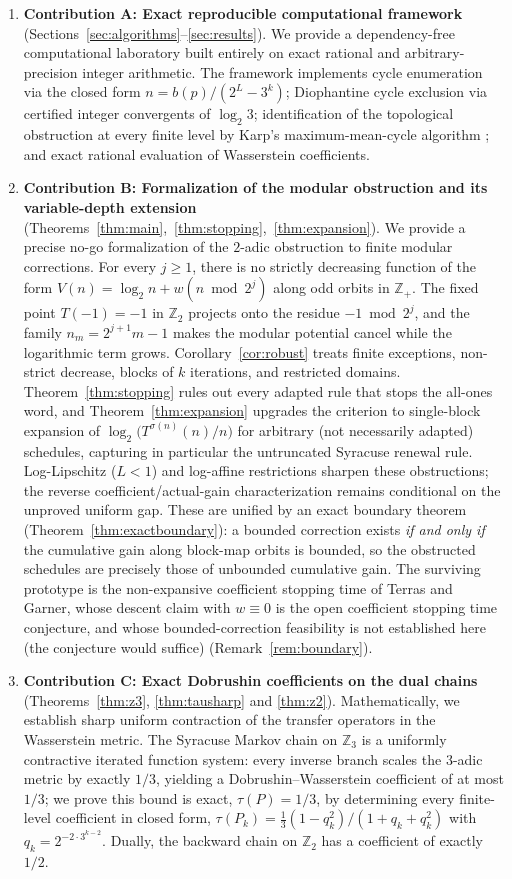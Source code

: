 \documentclass[11pt]{amsart}
\theoremstyle{definition}
\theoremstyle{remark}
\newcommand{\Z}{\mathbb{Z}}
\newcommand{\Ztwo}{\Z_2}
\newcommand{\Zthree}{\Z_3}
\begin{document}
\begin{enumerate}
\item \textbf{Contribution A: Exact reproducible computational framework} (Sections~\ref{sec:algorithms}--\ref{sec:results}). We provide a dependency-free computational laboratory built entirely on exact rational and arbitrary-precision integer arithmetic. The framework implements cycle enumeration via the closed form $n = b(p)/(2^L-3^k)$; Diophantine cycle exclusion via certified integer convergents of $\log_2 3$; identification of the topological obstruction at every finite level by Karp's maximum-mean-cycle algorithm \cite{karp1978}; and exact rational evaluation of Wasserstein coefficients.
\item \textbf{Contribution B: Formalization of the modular obstruction and its variable-depth extension} (Theorems~\ref{thm:main},~\ref{thm:stopping},~\ref{thm:expansion}). We provide a precise no-go formalization of the $2$-adic obstruction to finite modular corrections. For every $j \ge 1$, there is no strictly decreasing function of the form $V(n) = \log_2 n + w(n \bmod 2^j)$ along odd orbits in $\Z_+$. The fixed point $T(-1)=-1$ in $\Ztwo$ projects onto the residue $-1 \bmod 2^j$, and the family $n_m = 2^{j+1}m-1$ makes the modular potential cancel while the logarithmic term grows. Corollary~\ref{cor:robust} treats finite exceptions, non-strict decrease, blocks of $k$ iterations, and restricted domains. Theorem~\ref{thm:stopping} rules out every adapted rule that stops the all-ones word, and Theorem~\ref{thm:expansion} upgrades the criterion to single-block expansion of $\log_2\bigl(T^{\sigma(n)}(n)/n\bigr)$ for arbitrary (not necessarily adapted) schedules, capturing in particular the untruncated Syracuse renewal rule. Log-Lipschitz ($L<1$) and log-affine restrictions sharpen these obstructions; the reverse coefficient/actual-gain characterization remains conditional on the unproved uniform gap. These are unified by an exact boundary theorem (Theorem~\ref{thm:exactboundary}): a bounded correction exists \emph{if and only if} the cumulative gain along block-map orbits is bounded, so the obstructed schedules are precisely those of unbounded cumulative gain. The surviving prototype is the non-expansive coefficient stopping time of Terras and Garner, whose descent claim with $w\equiv 0$ is the open coefficient stopping time conjecture, and whose bounded-correction feasibility is not established here (the conjecture would suffice) (Remark~\ref{rem:boundary}).
\item \textbf{Contribution C: Exact Dobrushin coefficients on the dual chains} (Theorems~\ref{thm:z3}, \ref{thm:tausharp} and \ref{thm:z2}). Mathematically, we establish sharp uniform contraction of the transfer operators in the Wasserstein metric. The Syracuse Markov chain on $\Zthree$ is a uniformly contractive iterated function system: every inverse branch scales the $3$-adic metric by exactly $1/3$, yielding a Dobrushin--Wasserstein coefficient of at most $1/3$; we prove this bound is exact, $\tau(P) = 1/3$, by determining every finite-level coefficient in closed form, $\tau(P_k) = \tfrac13(1 - q_k^2)/(1 + q_k + q_k^2)$ with $q_k = 2^{-2\cdot 3^{k-2}}$. Dually, the backward chain on $\Ztwo$ has a coefficient of exactly $1/2$.

\end{enumerate}
\end{document}
